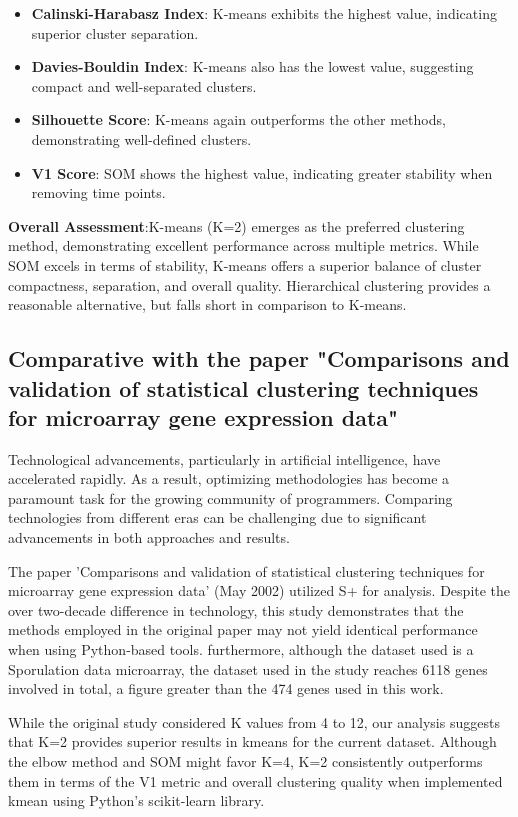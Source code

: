 \documentclass{llncs}
\begin{document}
  \begin{itemize}
  	\item \textbf{Calinski-Harabasz Index}: K-means exhibits the highest value, indicating superior cluster separation.
  	\item \textbf{Davies-Bouldin Index}: K-means also has the lowest value, suggesting compact and well-separated clusters.
  	\item \textbf{Silhouette Score}: K-means again outperforms the other methods, demonstrating well-defined clusters.
  	\item \textbf{V1 Score}: SOM shows the highest value, indicating greater stability when removing time points.
  \end{itemize}
  
  \textbf{Overall Assessment}:K-means (K=2) emerges as the preferred clustering method, demonstrating excellent performance across multiple metrics. While SOM excels in terms of stability, K-means offers a superior balance of cluster compactness, separation, and overall quality. Hierarchical clustering provides a reasonable alternative, but falls short in comparison to K-means.
  
  
  
  \subsection{Comparative with the paper "Comparisons and validation of statistical clustering techniques for microarray gene expression data"}
  
  Technological advancements, particularly in artificial intelligence, have accelerated rapidly. As a result, optimizing methodologies has become a paramount task for the growing community of programmers. Comparing technologies from different eras can be challenging due to significant advancements in both approaches and results.
  
  The paper 'Comparisons and validation of statistical clustering techniques for microarray gene expression data' (May 2002) utilized S+ for analysis. Despite the over two-decade difference in technology, this study demonstrates that the methods employed in the original paper may not yield identical performance when using Python-based tools. furthermore, although the dataset used is a Sporulation data microarray, the dataset used in the study reaches 6118 genes involved in total, a figure greater than the 474 genes used in this work.
  
  While the original study considered K values from 4 to 12, our analysis suggests that K=2 provides superior results in kmeans for the current dataset. Although the elbow method and SOM might favor K=4, K=2 consistently outperforms them in terms of the V1 metric and overall clustering quality when implemented kmean using Python's scikit-learn library.
 
\end{document}
